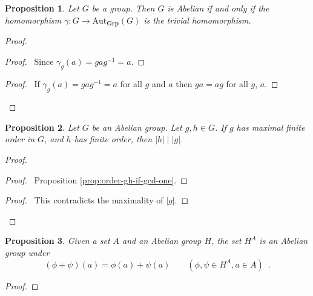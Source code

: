\documentclass{book}
\let\qed\relax
\newtheorem{prop}{Proposition}[chapter]
\theoremstyle{definition}
\newcommand{\Aut}[2]{\ensuremath{\mathrm{Aut}_{#1} \left( {#2} \right)}}
\newcommand{\Grp}{\ensuremath{\mathbf{Grp}}}
\newcommand{\inv}[1]{\ensuremath{{#1}^{-1}}}
\begin{document}
\begin{prop}
    Let $G$ be a group. Then $G$ is Abelian if and only if the homomorphism $\gamma : G \rightarrow \Aut{\Grp}{G}$ is the trivial homomorphism.
\end{prop}

\begin{proof}
    \pf
    \begin{proof}
        \pf\ Since $\gamma_g(a) = ga\inv{g} = a$.
    \end{proof}
    \begin{proof}
        \pf\ If $\gamma_g(a) = ga\inv{g} = a$ for all $g$ and $a$ then $ga = ag$ for all $g$, $a$.
    \end{proof}
    \qed
\end{proof}

\begin{prop}
    \label{prop:maximal-finite-order}
    Let $G$ be an Abelian group. Let $g,h \in G$. If $g$ has maximal finite order in $G$, and $h$ has finite order, then $|h| \mid |g|$.
\end{prop}

\begin{proof}
    \pf
    \begin{proof}
        \pf\ Proposition \ref{prop:order-gh-if-gcd-one}.
    \end{proof}
    \qedstep
    \begin{proof}
        \pf\ This contradicts the maximality of $|g|$.
    \end{proof}
    \qed
\end{proof}

\begin{prop}
    Given a set $A$ and an Abelian group $H$, the set $H^A$ is an Abelian group under
    \[ (\phi + \psi)(a) = \phi(a) + \psi(a) \qquad (\phi,\psi \in H^A, a \in A) \enspace . \]
\end{prop}

\begin{proof}
    \pf
    \qed
\end{proof}
\end{document}
